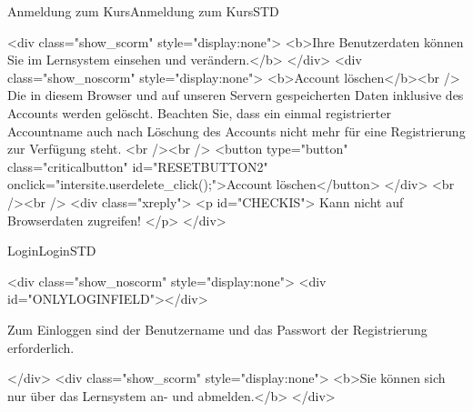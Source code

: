 \begin{MXContent}{Anmeldung zum Kurs}{Anmeldung zum Kurs}{STD}
%
%

\begin{html}
<div class="show_scorm" style="display:none">
<b>Ihre Benutzerdaten können Sie im Lernsystem einsehen und verändern.</b>
</div>
<div class="show_noscorm" style="display:none">
<b>Account löschen</b><br />
Die in diesem Browser und auf unseren Servern gespeicherten Daten inklusive des Accounts werden gelöscht.
Beachten Sie, dass ein einmal registrierter Accountname auch nach Löschung des Accounts nicht mehr für eine Registrierung
zur Verfügung steht.
<br /><br />
<button type="button" class="criticalbutton" id="RESETBUTTON2" onclick="intersite.userdelete_click();">Account löschen</button>
</div>
<br /><br />
<div class="xreply">
<p id="CHECKIS">
Kann nicht auf Browserdaten zugreifen!
</p>
</div>
\end{html}
\end{MXContent}

\begin{MXContent}{Login}{Login}{STD}
\MGlobalLoginTag
{}
\begin{html}
<div class="show_noscorm" style="display:none">
<div id="ONLYLOGINFIELD"></div>
\end{html}

Zum Einloggen sind der Benutzername und das Passwort der Registrierung erforderlich.

\begin{html}
</div>
<div class="show_scorm" style="display:none">
<b>Sie können sich nur über das Lernsystem an- und abmelden.</b>
</div>
\end{html}

\end{MXContent}


